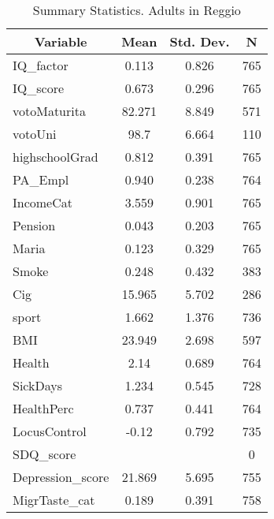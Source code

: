 
\begin{table}[htbp]\centering \caption{Summary Statistics. Adults in Reggio \label{cityAdultReggio}}
\begin{tabular}{l c c  c}\hline\hline
\multicolumn{1}{c}{\textbf{Variable}} & \textbf{Mean}
 & \textbf{Std. Dev.} & \textbf{N}\\ \hline
IQ\_factor & 0.113 & 0.826  & 765\\
IQ\_score & 0.673 & 0.296  & 765\\
votoMaturita & 82.271 & 8.849  & 571\\
votoUni & 98.7 & 6.664  & 110\\
highschoolGrad & 0.812 & 0.391  & 765\\
PA\_Empl & 0.940 & 0.238  & 764\\
IncomeCat & 3.559 & 0.901  & 765\\
Pension & 0.043 & 0.203  & 765\\
Maria & 0.123 & 0.329  & 765\\
Smoke & 0.248 & 0.432  & 383\\
Cig & 15.965 & 5.702  & 286\\
sport & 1.662 & 1.376  & 736\\
BMI & 23.949 & 2.698  & 597\\
Health & 2.14 & 0.689  & 764\\
SickDays & 1.234 & 0.545  & 728\\
HealthPerc & 0.737 & 0.441  & 764\\
LocusControl & -0.12 & 0.792  & 735\\
SDQ\_score &  &   & 0\\
Depression\_score & 21.869 & 5.695  & 755\\
MigrTaste\_cat & 0.189 & 0.391  & 758\\
\hline\end{tabular}
\end{table}
